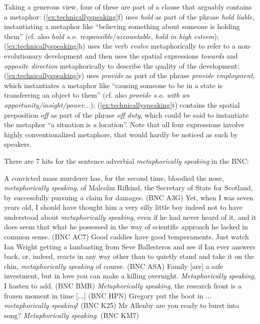 
Taking a generous view, four of these are part of a clause that arguably contains a metaphor: (\ref{ex:technicallyspeaking}f) uses \textit{hold} as part of the phrase \textit{hold liable}, instantiating a metaphor like ``believing something about someone is holding them'' (cf. also \textit{hold s.o. responsible}/\textit{accountable}, \textit{hold in high esteem}); (\ref{ex:technicallyspeaking}h) uses the verb \textit{evolve} metaphorically to refer to a non-evolutionary development and then uses the spatial expressions \textit{towards} and \textit{opposite direction} metaphorically to describe the quality of the development; (\ref{ex:technicallyspeaking}r) uses \textit{provide} as part of the phrase \textit{provide employment}, which instantiates a metaphor like ``causing someone to be in a state is transferring an object to them'' (cf. also \textit{provide s.o. with an opportunity/insight/power...}); (\ref{ex:technicallyspeaking}t) contains the spatial preposition \textit{off} as part of the phrase \textit{off duty}, which could be said to instantiate the metaphor ``a situation is a location''. Note that all four expressions involve highly conventionalized metaphors, that would hardly be noticed as such by speakers.

There are 7 hits for the sentence adverbial \textit{metaphorically speaking} in the BNC:

\begin{exe}
\ex
\begin{xlist} 
\label{ex:metaphoricallyspeaking}
\ex A convicted mass murderer has, for the second time, bloodied the nose, \textit{metaphorically speaking}, of Malcolm Rifkind, the Secretary of State for Scotland, by successfully pursuing a claim for damages. (BNC A3G) %
\ex Yet, when I was seven years old, I should have thought him a very silly little boy indeed not to have understood about \textit{metaphorically speaking}, even if he had never heard of it, and it does seem that what he possessed in the way of scientific approach he lacked in common sense. (BNC AC7) %
\ex Good caddies have good temperaments. Just watch Ian Wright getting a lambasting from Seve Ballesteros and see if Ian ever answers back, or, indeed, reacts in any way other than to quietly stand and take it on the chin, \textit{metaphorically speaking} of course. (BNC ASA) %
\ex Family [are] a safe investment, but in love you can make a killing overnight. \textit{Metaphorically speaking}, I hasten to add. (BNC BMR) %
\ex \textit{Metaphorically speaking}, the research front is a frozen moment in time $[$...$]$  (BNC HPN) %
\ex Gregory put the boot in ... \textit{metaphorically speaking}! (BNC K25) %
\ex Mr Allenby are you ready to burst into song? \textit{Metaphorically speaking}. (BNC KM7) %
\end{xlist}
\end{exe}

